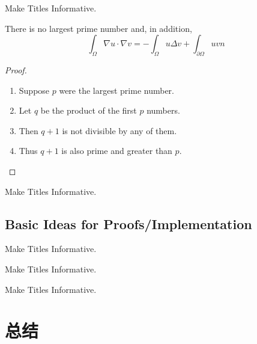 \documentclass{beamer}
\begin{document}
\begin{frame}{Make Titles Informative.}
\begin{theorem}
 There is no largest prime number and, in addition, $$\int_\Omega \nabla u \cdot \nabla v = - \int_\Omega u \Delta v + \int_{\partial\Omega} u v n$$
 \end{theorem}
 \begin{proof}
 \begin{enumerate}
 \item<1-> Suppose $p$ were the largest prime number.
 \item<2-> Let $q$ be the product of the first $p$ numbers.
 \item<3-> Then $q + 1$ is not divisible by any of them.
 \item<1-> Thus $q + 1$ is also prime and greater than $p$.\qedhere
 \end{enumerate}
 \end{proof}
\end{frame}

\begin{frame}{Make Titles Informative.}
\end{frame}


\subsection{Basic Ideas for Proofs/Implementation}

\begin{frame}{Make Titles Informative.}
\end{frame}

\begin{frame}{Make Titles Informative.}
\end{frame}

\begin{frame}{Make Titles Informative.}
\end{frame}



\section*{总结}
\end{document}
